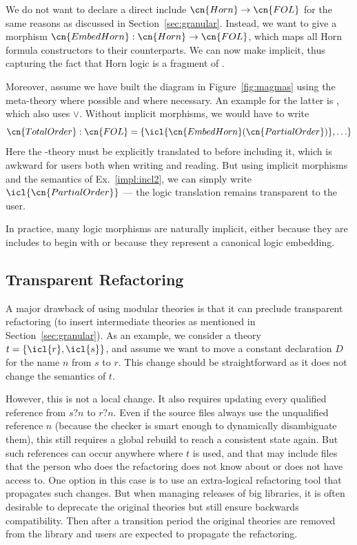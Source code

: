 We do not want to declare a direct include $\cn{Horn}\to\cn{FOL}$ for the same reasons as discussed in  Section~\ref{sec:granular}.
Instead, we want to give a morphism $\cn{EmbedHorn}:\cn{Horn}\to\cn{FOL}$, which maps all Horn formula constructors to their  counterparts.
We can now make  implicit, thus capturing the fact that Horn logic is a fragment of .

Moreover, assume we have built the diagram in Figure~\ref{fig:magmas} using the meta-theory  where possible and  where necessary.
An example for the latter is , which also uses $\vee$.
Without implicit morphisms, we would have to write
\[\cn{TotalOrder}:\cn{FOL}=\{\icl{\cn{EmbedHorn}(\cn{PartialOrder})},\ldots\}\]
Here the -theory  must be explicitly translated to  before including it, which is awkward for users both when writing and reading.
But using implicit morphisms and the semantics of Ex.~\ref{impl:incl2}, we can simply write $\icl{\cn{PartialOrder}}$ --- the logic translation remains transparent to the user.

In practice, many logic morphisms are naturally implicit, either because they are includes to begin with or because they represent a canonical logic embedding.

\subsection{Transparent Refactoring}

A major drawback of using modular theories is that it can preclude transparent refactoring (to insert intermediate theories as mentioned in Section~\ref{sec:granular}).
As an example, we consider a theory $t=\{\icl{r},\icl{s}\}$, and assume we want to move a constant declaration $D$ for the name $n$ from $s$ to $r$.
This change should be straightforward as it does not change the semantics of $t$.

However, this is not a local change.
It also requires updating every qualified reference from $s?n$ to $r?n$.
Even if the source files always use the unqualified reference $n$ (because the checker is smart enough to dynamically disambiguate them), this still requires a global rebuild to reach a consistent state again.
But such references can occur anywhere where $t$ is used, and that may include files that the person who does the refactoring does not know about or does not have access to.
One option in this case is to use an extra-logical refactoring tool that propagates such changes.
But when managing releases of big libraries, it is often desirable to deprecate the original theories but still ensure backwards compatibility.
Then after a transition period the original theories are removed from the library and users are expected to propagate the refactoring.

